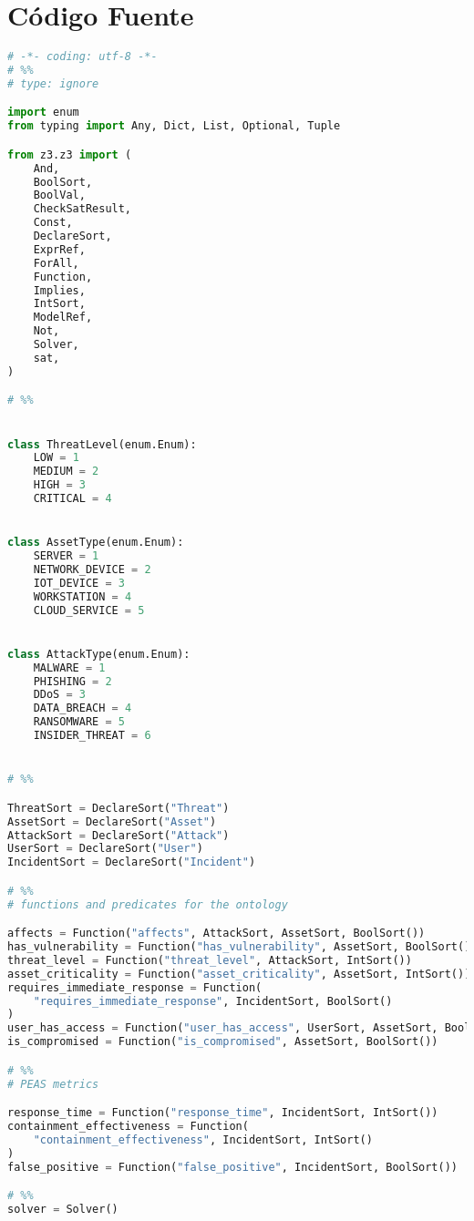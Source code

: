 \appendix

\section{Código Fuente}\label{source_code}
\begin{lstlisting}[language=python, inputencoding=utf8]
# -*- coding: utf-8 -*-
# %%
# type: ignore

import enum
from typing import Any, Dict, List, Optional, Tuple

from z3.z3 import (
    And,
    BoolSort,
    BoolVal,
    CheckSatResult,
    Const,
    DeclareSort,
    ExprRef,
    ForAll,
    Function,
    Implies,
    IntSort,
    ModelRef,
    Not,
    Solver,
    sat,
)

# %%


class ThreatLevel(enum.Enum):
    LOW = 1
    MEDIUM = 2
    HIGH = 3
    CRITICAL = 4


class AssetType(enum.Enum):
    SERVER = 1
    NETWORK_DEVICE = 2
    IOT_DEVICE = 3
    WORKSTATION = 4
    CLOUD_SERVICE = 5


class AttackType(enum.Enum):
    MALWARE = 1
    PHISHING = 2
    DDoS = 3
    DATA_BREACH = 4
    RANSOMWARE = 5
    INSIDER_THREAT = 6


# %%

ThreatSort = DeclareSort("Threat")
AssetSort = DeclareSort("Asset")
AttackSort = DeclareSort("Attack")
UserSort = DeclareSort("User")
IncidentSort = DeclareSort("Incident")

# %%
# functions and predicates for the ontology

affects = Function("affects", AttackSort, AssetSort, BoolSort())
has_vulnerability = Function("has_vulnerability", AssetSort, BoolSort())
threat_level = Function("threat_level", AttackSort, IntSort())
asset_criticality = Function("asset_criticality", AssetSort, IntSort())
requires_immediate_response = Function(
    "requires_immediate_response", IncidentSort, BoolSort()
)
user_has_access = Function("user_has_access", UserSort, AssetSort, BoolSort())
is_compromised = Function("is_compromised", AssetSort, BoolSort())

# %%
# PEAS metrics

response_time = Function("response_time", IncidentSort, IntSort())
containment_effectiveness = Function(
    "containment_effectiveness", IncidentSort, IntSort()
)
false_positive = Function("false_positive", IncidentSort, BoolSort())

# %%
solver = Solver()


\end{lstlisting}
